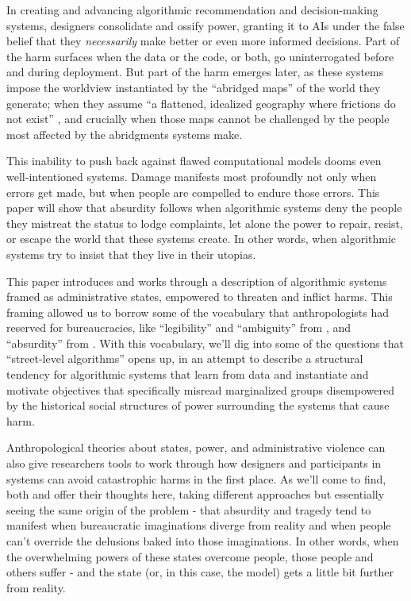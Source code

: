 \documentclass[manuscript,screen]{acmart}
\begin{document}
In creating and advancing algorithmic recommendation and decision-making systems, designers consolidate and ossify power, granting it to AIs under the false belief that they \emph{necessarily} make better or even more informed decisions.
Part of the harm surfaces when the data or the code, or both, go uninterrogated before and during deployment.
But part of the harm emerges later, as these systems impose the worldview instantiated by the ``abridged maps'' of the world they generate;
when they  assume ``a flattened, idealized geography where frictions do not exist''
\cite{GoJekAlgo}, and crucially when those maps cannot be challenged by the people most affected by the abridgments systems make.

This inability to push back against flawed computational models dooms even well-intentioned systems.
Damage manifests most profoundly not only when errors get made, but when people are compelled to endure those errors.
This paper will show that absurdity follows when
algorithmic systems deny the people they mistreat the status to lodge complaints, let alone the power to repair, resist, or escape the world that these systems create.
In other words, when algorithmic systems try to insist that they live in their utopias.

This paper introduces and works through a description of algorithmic systems framed as administrative states, empowered to threaten and inflict harms.
This framing allowed us to borrow some of the vocabulary that anthropologists had reserved for bureaucracies, like ``legibility'' and ``ambiguity'' from \citeauthor{scott1998seeing}, and ``absurdity'' from \citeauthor{graeber2015utopia}
\cite{graeber2015utopia,scott1998seeing}.
With this vocabulary, we'll dig into some of the questions that ``street-level algorithms'' opens up, in an attempt to describe a structural tendency for algorithmic systems that learn from data and instantiate and motivate objectives that specifically misread marginalized groups disempowered by the historical social structures of power surrounding the systems that cause harm.

Anthropological theories about states, power, and administrative violence can also give researchers tools to work through how designers and participants in systems can avoid catastrophic harms in the first place.
As we'll come to find, both \citeauthor{scott1998seeing} and \citeauthor{graeber2015utopia} offer their thoughts here, taking different approaches but essentially seeing the same origin of the problem - that absurdity and tragedy tend to manifest when bureaucratic imaginations diverge from reality and when people can't override the delusions baked into those imaginations.
In other words, when the overwhelming powers of these states overcome people, those people and others suffer - and the state (or, in this case, the model) gets a little bit further from reality.
\end{document}

